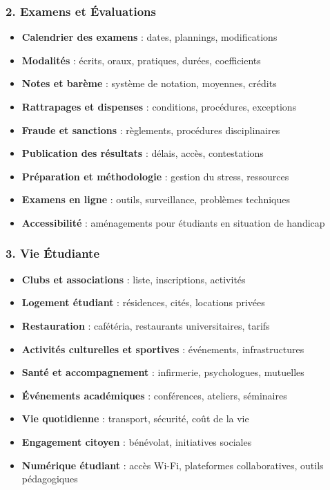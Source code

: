 \documentclass[11pt,a4paper]{article}
\begin{document}
\subsubsection{2. Examens et Évaluations}
\begin{itemize}
    \item \textbf{Calendrier des examens} : dates, plannings, modifications
    \item \textbf{Modalités} : écrits, oraux, pratiques, durées, coefficients
    \item \textbf{Notes et barème} : système de notation, moyennes, crédits
    \item \textbf{Rattrapages et dispenses} : conditions, procédures, exceptions
    \item \textbf{Fraude et sanctions} : règlements, procédures disciplinaires
    \item \textbf{Publication des résultats} : délais, accès, contestations
    \item \textbf{Préparation et méthodologie} : gestion du stress, ressources
    \item \textbf{Examens en ligne} : outils, surveillance, problèmes techniques
    \item \textbf{Accessibilité} : aménagements pour étudiants en situation de handicap
\end{itemize}

\subsubsection{3. Vie Étudiante}
\begin{itemize}
    \item \textbf{Clubs et associations} : liste, inscriptions, activités
    \item \textbf{Logement étudiant} : résidences, cités, locations privées
    \item \textbf{Restauration} : cafétéria, restaurants universitaires, tarifs
    \item \textbf{Activités culturelles et sportives} : événements, infrastructures
    \item \textbf{Santé et accompagnement} : infirmerie, psychologues, mutuelles
    \item \textbf{Événements académiques} : conférences, ateliers, séminaires
    \item \textbf{Vie quotidienne} : transport, sécurité, coût de la vie
    \item \textbf{Engagement citoyen} : bénévolat, initiatives sociales
    \item \textbf{Numérique étudiant} : accès Wi-Fi, plateformes collaboratives, outils pédagogiques
\end{itemize}
\end{document}
